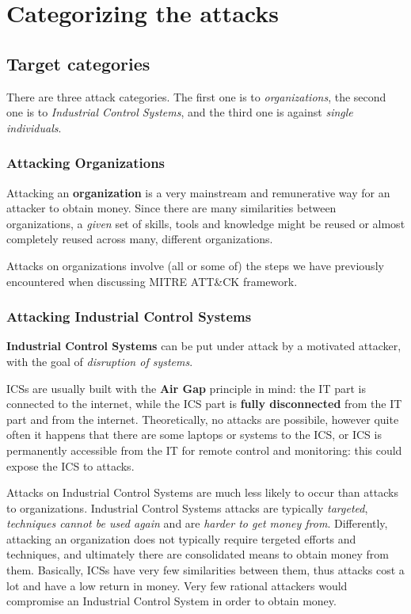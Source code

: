 \documentclass[10pt]{\classname}
\begin{document}
\chapter{Categorizing the attacks}


\section{Target categories}

There are three attack categories. The first one is to \emph{organizations},
the second one is to \emph{Industrial Control Systems}, and the third one
is against \emph{single individuals}.

\subsection{Attacking Organizations}

Attacking an \textbf{organization} is a very mainstream and remunerative way
for an attacker to obtain money. Since there are many similarities between
organizations, a \emph{given} set of skills, tools and knowledge might be
reused or almost completely reused across many, different organizations.

Attacks on organizations involve (all or some of) the steps we have previously
encountered when discussing MITRE ATT\&CK framework.

\subsection{Attacking Industrial Control Systems}

\textbf{Industrial Control Systems} can be put under attack by a motivated
attacker, with the goal of \emph{disruption of systems}.

ICSs are usually built with the \textbf{Air Gap} principle in mind: the IT part
is connected to the internet, while the ICS part is \textbf{fully disconnected}
from the IT part and from the internet. Theoretically, no attacks are
possibile, however quite often it happens that there are some laptops or
systems to the ICS, or ICS is permanently accessible from the IT for remote
control and monitoring: this could expose the ICS to attacks.

Attacks on Industrial Control Systems are much less likely to occur than
attacks to organizations. Industrial Control Systems attacks are typically
\emph{targeted}, \emph{techniques cannot be used again} and are \emph{harder to
get money from}. Differently, attacking an organization does not typically
require tergeted efforts and techniques, and ultimately there are consolidated
means to obtain money from them. Basically, ICSs have very few similarities
between them, thus attacks cost a lot and have a low return in money. Very few
rational attackers would compromise an Industrial Control System in order to
obtain money.
\end{document}
